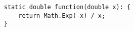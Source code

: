 \begin{lstlisting}
	static double function(double x): {
		return Math.Exp(-x) / x;
	}
\end{lstlisting}